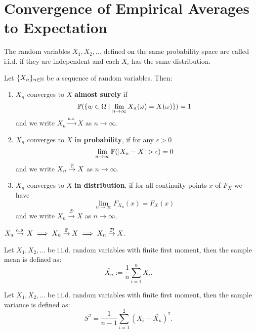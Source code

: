 \section{Convergence of Empirical Averages to Expectation}

\begin{definition*}
  The random variables \(X_1, X_2, \ldots\) defined on the same probability space are called i.i.d. if they are independent and each \(X_i\) has the same distribution.
\end{definition*}

\begin{definition*}
  Let \(\{X_n\}_{n \in \N}\) be a sequence of random variables. Then:
  \begin{enumerate}
    \item \(X_n\) converges to \(X\) \textbf{almost surely} if
    \[\P(\{w \in \Omega \mid \lim_{n\to\infty} X_n(\omega) = X(\omega)\}) = 1\]
    and we write \(X_n \stackrel{a.s.}{\to} X\) as \(n \to \infty\).
    \item \(X_n\) converges to \(X\) \textbf{in probability}, if for any \(\epsilon > 0\)
    \[\lim_{n \to \infty} \P(|X_n - X| > \epsilon) = 0\]
    and we write \(X_n \stackrel{\P}{\to} X\) as \(n \to \infty\).
    \item \(X_n\) converges to \(X\) \textbf{in distribution}, if for all continuity points \(x\) of \(F_X\) we have
    \[\lim_{n \to \infty} F_{X_n}(x) = F_X(x)\]
    and we write \(X_n \stackrel{\mathcal{D}}{\to} X\) as \(n \to \infty\).
  \end{enumerate}
\end{definition*}

\begin{lemma}
  \(X_n \stackrel{a.s.}{\to} X \implies X_n \stackrel{\P}{\to} X \implies X_n \stackrel{\mathcal{D}}{\to} X\).
\end{lemma}

\begin{definition*}
    Let \(X_1, X_2, \ldots\) be i.i.d. random variables with finite first moment, then the sample mean is defined as:
    \[\bar{X_n} := \frac{1}{n}\sum_{i=1}^n X_i.\]
\end{definition*}

\begin{definition*}
  Let \(X_1, X_2, \ldots\) be i.i.d. random variables with finite first moment, then the sample variance is defined as:
  \[S^2 = \frac{1}{n-1}\sum_{i=1}^2(X_i - \bar{X_n})^2.\]
\end{definition*}

